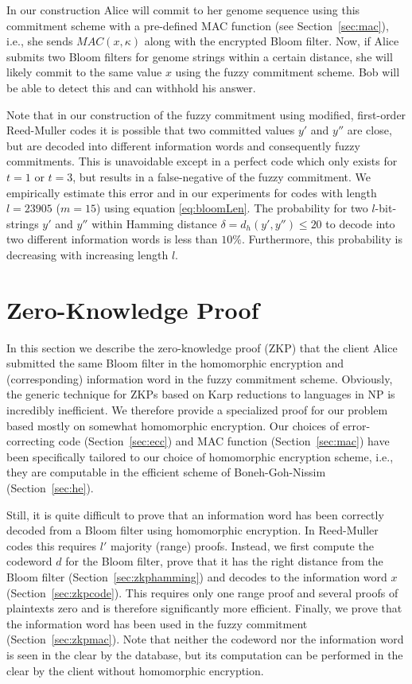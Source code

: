 \documentclass{llncs}
\begin{document}
In our construction Alice will commit to her genome sequence using this commitment scheme with a pre-defined MAC function (see Section~\ref{sec:mac}), i.e., she sends $MAC(x, \kappa)$ along with the encrypted Bloom filter.
Now, if Alice submits two Bloom filters for genome strings within a certain distance, she will likely commit to the same value $x$ using the fuzzy commitment scheme.
Bob will be able to detect this and can withhold his answer.

Note that in our construction of the fuzzy commitment using modified, first-order Reed-Muller codes it is possible that two committed values $y'$ and $y''$ are close, but are decoded into different information words and consequently fuzzy commitments.
This is unavoidable except in a perfect code which only exists for $t = 1$ or $t = 3$, but results in a false-negative of the fuzzy commitment.
We empirically estimate this error and in our experiments for codes with length $l = 23905$ ($m = 15$) using equation \eqref{eq:bloomLen}.
The probability for two $l$-bit-strings $y'$ and $y''$ within Hamming distance $\delta = d_h(y', y'') \leq 20$ to decode into two different information words is less than $10\%$.
Furthermore, this probability is decreasing with increasing length $l$.



\section{Zero-Knowledge Proof}
\label{sec:zkp}

In this section we describe the zero-knowledge proof (ZKP) that the client Alice submitted the same Bloom filter in the homomorphic encryption and (corresponding) information word in the fuzzy commitment scheme.
Obviously, the generic technique for ZKPs based on Karp reductions to languages in NP is incredibly inefficient.
We therefore provide a specialized proof for our problem based mostly on somewhat homomorphic encryption.
Our choices of error-correcting code (Section~\ref{sec:ecc}) and MAC function (Section~\ref{sec:mac}) have been specifically tailored to our choice of homomorphic encryption scheme, i.e., they are computable in the efficient scheme of Boneh-Goh-Nissim (Section~\ref{sec:he}).

Still, it is quite difficult to prove that an information word has been correctly decoded from a Bloom filter using homomorphic encryption.
In Reed-Muller codes this requires $l'$ majority (range) proofs.
Instead, we first compute the codeword $d$ for the Bloom filter, prove that it has the right distance from the Bloom filter (Section~\ref{sec:zkphamming}) and decodes to the information word $x$ (Section~\ref{sec:zkpcode}).
This requires only one range proof and several proofs of plaintexts zero and is therefore significantly more efficient.
Finally, we prove that the information word has been used in the fuzzy commitment (Section~\ref{sec:zkpmac}).
Note that neither the codeword nor the information word is seen in the clear by the database, but its computation can be performed in the clear by the client without homomorphic encryption.
\end{document}
